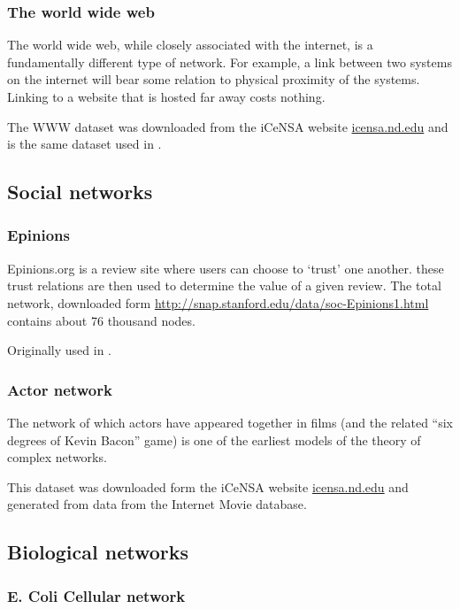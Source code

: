 \documentclass{article}
\theoremstyle{definition}
\begin{document}
\subsubsection*{The world wide web}

The world wide web, while closely associated with the internet, is a fundamentally different type of network. For example, a link between two systems on the internet will bear some relation to physical proximity of the systems. Linking to a website that is hosted far away costs nothing.

The WWW dataset was downloaded from the iCeNSA website \url{icensa.nd.edu} and is the same dataset used in \cite{song2005self}.

\subsection*{Social networks}
\subsubsection*{Epinions}

Epinions.org is a review site where users can choose to `trust' one another. these trust relations are then used to determine the value of a given review. The total network, downloaded form \url{http://snap.stanford.edu/data/soc-Epinions1.html} contains about 76 thousand nodes.

Originally used in \cite{richardson2003trust}.

\subsubsection*{Actor network}

The network of which actors have appeared together in films (and the related ``six degrees of Kevin Bacon'' game) is one of the earliest models of the theory of complex networks. 

This dataset was downloaded form the iCeNSA website \url{icensa.nd.edu} and generated from data from the Internet Movie database.

\subsection*{Biological networks}
\subsubsection*{E. Coli Cellular network}
\end{document}
